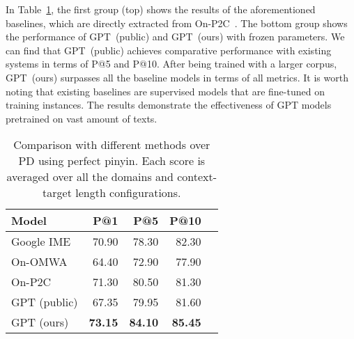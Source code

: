 In Table~\ref{tab:perfect}, the first group (top) shows the results of the aforementioned baselines, which are directly extracted from On-P2C~\cite{zhang-etal-2019-open}.
The bottom group shows the performance of GPT~(public) and GPT~(ours) with 
% 
frozen parameters.
We can find that GPT~(public) achieves comparative performance with existing systems in terms of P@5 and P@10.
After being trained with a larger corpus, GPT~(ours) surpasses all the baseline models in terms of all metrics.
It is worth noting that existing baselines are supervised models that are fine-tuned on training instances. 
The results demonstrate the effectiveness of GPT models pretrained on vast amount of texts.

\begin{table}[t]\centering
\begin{tabular}{lrrrr}\toprule
Model&P@1 &P@5 &P@10 \\\midrule
Google IME  & 70.90 & 78.30 &82.30 \\
On-OMWA  & 64.40 &72.90 &77.90 \\
On-P2C  & 71.30 &80.50 &81.30\\\midrule
GPT (public)  &  67.35& 79.95& 81.60\\
GPT (ours)  & \textbf{73.15} & \textbf{84.10} & \textbf{85.45}  \\
\bottomrule
\end{tabular}
\caption{Comparison with different methods over PD using perfect pinyin. Each score is averaged over all the domains and context-target length configurations.}
\label{tab:perfect}
\end{table}



